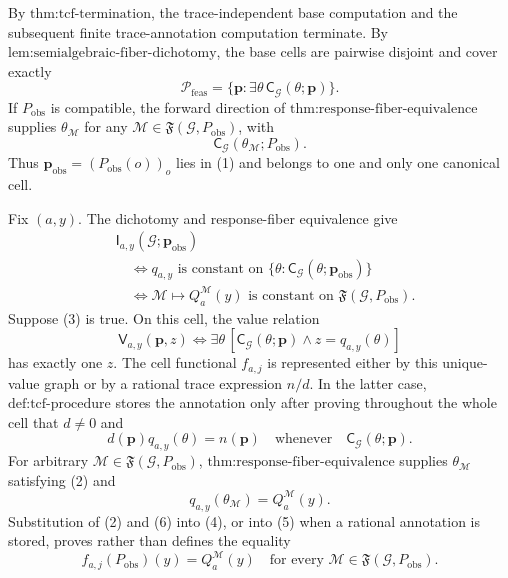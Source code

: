 By \(\text{thm:tcf-termination}\), the trace-independent base computation and the subsequent finite trace-annotation computation terminate. By \(\text{lem:semialgebraic-fiber-dichotomy}\), the base cells are pairwise disjoint and cover exactly
\[
\mathcal P_{\mathrm{feas}}
=\{\mathbf p:\exists\theta\,\mathsf C_{\mathcal G}(\theta;\mathbf p)\}.
\tag{1}
\]
If \(P_{\mathrm{obs}}\) is compatible, the forward direction of \(\text{thm:response-fiber-equivalence}\) supplies \(\theta_{\mathcal M}\) for any \(\mathcal M\in\mathfrak F(\mathcal G,P_{\mathrm{obs}})\), with
\[
\mathsf C_{\mathcal G}(\theta_{\mathcal M};P_{\mathrm{obs}}).
\tag{2}
\]
Thus \(\mathbf p_{\mathrm{obs}}=(P_{\mathrm{obs}}(o))_o\) lies in (1) and belongs to one and only one canonical cell.

Fix \((a,y)\). The dichotomy and response-fiber equivalence give
\[
\begin{aligned}
&\mathsf I_{a,y}(\mathcal G;\mathbf p_{\mathrm{obs}})\\
&\quad\Longleftrightarrow
q_{a,y}\text{ is constant on }
\{\theta:\mathsf C_{\mathcal G}(\theta;\mathbf p_{\mathrm{obs}})\}\\
&\quad\Longleftrightarrow
\mathcal M\longmapsto Q_a^{\mathcal M}(y)
\text{ is constant on }\mathfrak F(\mathcal G,P_{\mathrm{obs}}).
\end{aligned}
\tag{3}
\]
Suppose (3) is true. On this cell, the value relation
\[
\mathsf V_{a,y}(\mathbf p,z)
\Longleftrightarrow
\exists\theta\,[\mathsf C_{\mathcal G}(\theta;\mathbf p)
\wedge z=q_{a,y}(\theta)]
\tag{4}
\]
has exactly one \(z\). The cell functional \(f_{a,j}\) is represented either by this unique-value graph or by a rational trace expression \(n/d\). In the latter case, \(\text{def:tcf-procedure}\) stores the annotation only after proving throughout the whole cell that \(d\neq0\) and
\[
d(\mathbf p)q_{a,y}(\theta)=n(\mathbf p)
\quad\text{whenever}\quad
\mathsf C_{\mathcal G}(\theta;\mathbf p).
\tag{5}
\]
For arbitrary \(\mathcal M\in\mathfrak F(\mathcal G,P_{\mathrm{obs}})\), \(\text{thm:response-fiber-equivalence}\) supplies \(\theta_{\mathcal M}\) satisfying (2) and
\[
q_{a,y}(\theta_{\mathcal M})=Q_a^{\mathcal M}(y).
\tag{6}
\]
Substitution of (2) and (6) into (4), or into (5) when a rational annotation is stored, proves rather than defines the equality
\[
f_{a,j}(P_{\mathrm{obs}})(y)=Q_a^{\mathcal M}(y)
\quad
\text{for every }\mathcal M\in\mathfrak F(\mathcal G,P_{\mathrm{obs}}).
\tag{7}
\]

